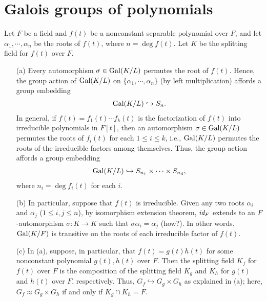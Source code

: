 \section{Galois groups of polynomials}

\begin{rmk}
    Let $F$ be a field and $f(t)$ be a nonconstant separable polynomial over $F$, and let $\alpha_1, \cdots, \alpha_n$ be the roots of $f(t)$, where $n=\deg f(t)$.
    Let $K$ be the splitting field for $f(t)$ over $F$.
    \begin{enumerate}
        \item[(a)]
        {
            Every automorphism $\sigma\in{\textrm{Gal}({K/L})}$ permutes the root of $f(t)$.
            Hence, the group action of ${\textrm{Gal}({K/L})}$ on $\{\alpha_1, \cdots, \alpha_n\}$ (by left multiplication) affords a group embedding
            \begin{align*}
                {\textrm{Gal}({K/L})}\hookrightarrow S_n.
            \end{align*}
            In general, if $f(t)=f_1(t)\cdots f_k(t)$ is the factorization of $f(t)$ into irreducible polynomials in $F[t]$, then an automorphism $\sigma\in{\textrm{Gal}({K/L})}$ permutes the roots of $f_i(t)$ for each $1\leq i\leq k$, i.e., ${\textrm{Gal}({K/L})}$ permutes the roots of the irreducible factors among themselves.
            Thus, the group action affords a group embedding
            \begin{align*}
                {\textrm{Gal}({K/L})}\hookrightarrow S_{n_1}\times\cdots\times S_{n_d},
            \end{align*}
            where $n_i=\deg f_i(t)$ for each $i$.
        }
        \item[(b)]
        {
            In particular, suppose that $f(t)$ is irreducible.
            Given any two roots $\alpha_i$ and $\alpha_j$ ($1\leq i, j\leq n$), by isomorphism extension theorem, $\textit{id}_{F}$ extends to an $F$-automorphism $\sigma: K\rightarrow K$ such that $\sigma\alpha_i=\alpha_j$ \color{brown}(how?)\color{black}.
            In other words, ${\textrm{Gal}({K/F})}$ is transitive on the roots of each irreducible factor of $f(t)$.
        }
        \item[(c)]
        {
            In (a), suppose, in particular, that $f(t)=g(t)h(t)$ for some nonconstant polynomial $g(t), h(t)$ over $F$.
            Then the splitting field $K_f$ for $f(t)$ over $F$ is the composition of the splitting field $K_g$ and $K_h$ for $g(t)$ and $h(t)$ over $F$, respectively.
            Thus, $G_f\hookrightarrow G_g\times G_h$ as explained in (a); here, $G_f\approx G_g\times G_h$ if and only if $K_g\cap K_h=F$.
        }
    \end{enumerate}
\end{rmk}


